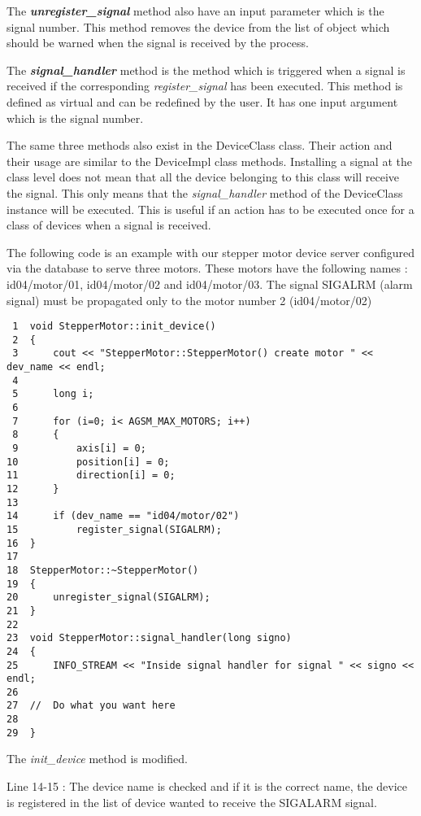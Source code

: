 The \textbf{\emph{unregister\_signal}} method
also have an input parameter which is the signal number. This method
removes the device from the list of object which should be warned
when the signal is received by the process.

The \textbf{\emph{signal\_handler}} method
is the method which is triggered when a signal is received if the
corresponding \emph{register\_signal} has been executed. This method
is defined as virtual and can be redefined by the user. It has one
input argument which is the signal number.

The same three methods also exist in the DeviceClass
class. Their action and their usage are similar to the DeviceImpl
class methods. Installing a signal at the class level does not mean
that all the device belonging to this class will receive the signal.
This only means that the \emph{signal\_handler} method of the DeviceClass
instance will be executed. This is useful if an action has to be executed
once for a class of devices when a signal is received.

The following code is an example with our stepper motor device server
configured via the database to serve three motors. These motors have
the following names : id04/motor/01, id04/motor/02 and id04/motor/03.
The signal SIGALRM (alarm signal) must be propagated only to the motor
number 2 (id04/motor/02)


\begin{verbatim}
 1  void StepperMotor::init_device()
 2  {
 3      cout << "StepperMotor::StepperMotor() create motor " << dev_name << endl;
 4  
 5      long i;
 6  
 7      for (i=0; i< AGSM_MAX_MOTORS; i++)
 8      {
 9          axis[i] = 0;
10          position[i] = 0;
11          direction[i] = 0;
12      }
13  
14      if (dev_name == "id04/motor/02")
15          register_signal(SIGALRM);
16  }
17  
18  StepperMotor::~StepperMotor()
19  {
20      unregister_signal(SIGALRM);
21  }
22  
23  void StepperMotor::signal_handler(long signo)
24  {
25      INFO_STREAM << "Inside signal handler for signal " << signo << endl;
26  
27  //  Do what you want here
28  
29  }
\end{verbatim}


The \emph{init\_device} method is modified.

Line 14-15 : The device name is checked and if it is the correct name,
the device is registered in the list of device wanted to receive the
SIGALARM signal.

